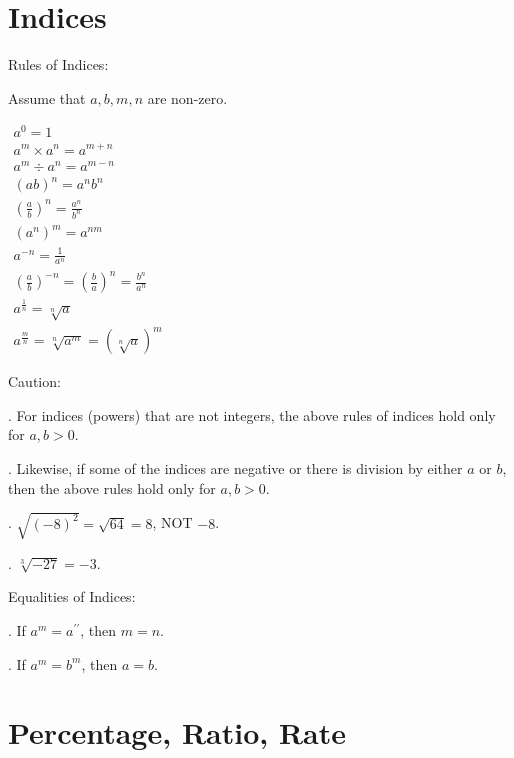 \documentclass[twocolumn]{article}
\begin{document}
\section*{Indices}

\noindent 
Rules of Indices:

\bigskip 

\noindent 
Assume that $a,b,m,n$ are non-zero.

\noindent 
$\begin{gathered} a^0=1 \\ a^m \times a^n=a^{m+n} \\ a^m \div a^n=a^{m-n} \\ (a b)^n=a^n b^n \\ \left(\frac{a}{b}\right)^n=\frac{a^n}{b^n} \\ \left(a^n\right)^m=a^{n m} \\ a^{-n}=\frac{1}{a^n} \\ \left(\frac{a}{b}\right)^{-n}=\left(\frac{b}{a}\right)^n=\frac{b^n}{a^n} \\  a^{\frac{1}{n}}=\sqrt[n]{a} \\ a^{\frac{m}{n}}=\sqrt[n]{a^m}=(\sqrt[n]{a})^m\end{gathered}$

\noindent
Caution:

. For indices (powers) that are not integers, the above rules of indices hold only for $a,b > 0$.

. Likewise, if some of the indices are negative or there is division by either $a$ or $b$, then the above rules hold only for $a,b > 0$.

. $\sqrt{(-8)^2} = \sqrt{64} = 8$, NOT $-8$.

. $\sqrt[3]{-27} = -3$.

\bigskip 

\noindent 
Equalities of Indices:

. If $a^m=a^{\prime \prime}$, then $m=n$.

. If $a^m=b^m$, then $a=b$.

\section*{Percentage, Ratio, Rate}
\end{document}
